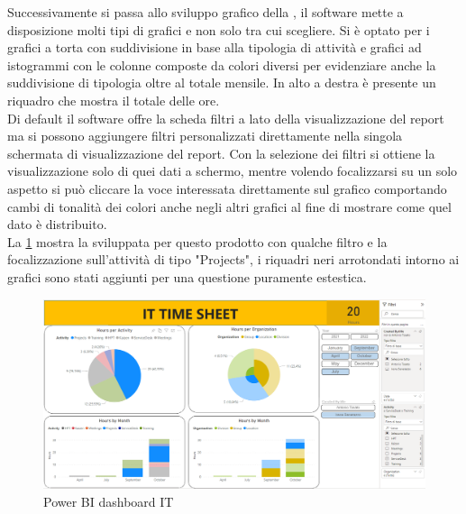 Successivamente si passa allo sviluppo grafico della , il software mette a disposizione molti tipi di grafici e non solo tra cui scegliere.
Si è optato per i grafici a torta con suddivisione in base alla tipologia di attività e grafici ad istogrammi con le colonne composte da colori diversi per evidenziare anche la suddivisione di tipologia oltre al totale mensile.
In alto a destra è presente un riquadro che mostra il totale delle ore.\\
Di default il software offre la scheda filtri a lato della visualizzazione del report ma si possono aggiungere filtri personalizzati direttamente nella singola schermata di visualizzazione del report.
Con la selezione dei filtri si ottiene la visualizzazione solo di quei dati a schermo, mentre volendo focalizzarsi su un solo aspetto si può cliccare la voce interessata direttamente sul grafico comportando cambi di tonalità dei colori anche negli altri grafici al fine di mostrare come quel dato è distribuito.\\
La \figurename \space \ref*{fig:IT-PowerBIdashboard} mostra la  sviluppata per questo prodotto con qualche filtro e la focalizzazione sull'attività di tipo "Projects", i riquadri neri arrotondati intorno ai grafici sono stati aggiunti per una questione puramente estestica.
\begin{figure}[H]
  \centering\includegraphics[width=1\textwidth, height=1\textheight,keepaspectratio]{immagini/IT-PowerBI_dashboard.png}
  \caption{Power BI dashboard IT}
  \label{fig:IT-PowerBIdashboard}
\end{figure}

